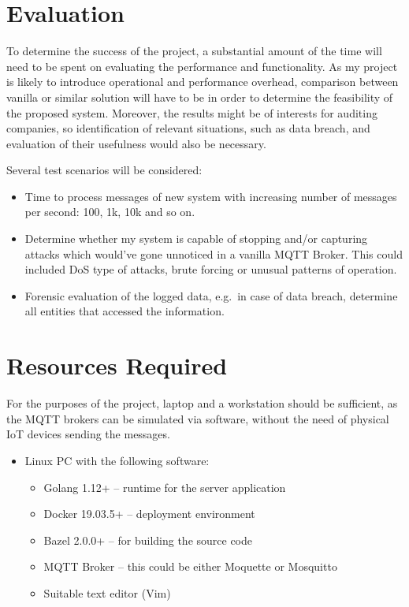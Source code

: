 \documentclass[a4paper,12pt]{article}
\begin{document}
\section*{Evaluation}
To determine the success of the project, a substantial amount of the time will need to be spent on evaluating the performance and functionality. As my project is likely to introduce operational and performance overhead, comparison between vanilla or similar solution will have to be in order to determine the feasibility of the proposed system. Moreover, the results might be of interests for auditing companies, so identification of relevant situations, such as data breach, and evaluation of their usefulness would also be necessary.

Several test scenarios will be considered:
\begin{itemize}
  \item Time to process messages of new system with increasing number of messages per second: 100, 1k, 10k and so on.
  \item Determine whether my system is capable of stopping and/or capturing attacks which would've gone unnoticed in a vanilla MQTT Broker. This could included DoS type of attacks, brute forcing or unusual patterns of operation.
  \item Forensic evaluation of the logged data, e.g.\ in case of data breach, determine all entities that accessed the information. 
\end{itemize}

\section*{Resources Required}

For the purposes of the project, laptop and a workstation should be sufficient, as the MQTT brokers can be simulated via software, without the need of physical IoT devices sending the messages.

\begin{itemize}
  \item Linux PC with the following software: 
    \begin{itemize}
      \item Golang 1.12+ -- runtime for the server application
      \item Docker 19.03.5+ -- deployment environment
      \item Bazel 2.0.0+ -- for building the source code
      \item MQTT Broker -- this could be either Moquette or Mosquitto
      \item Suitable text editor (Vim)
    \end{itemize}
\end{itemize}
\end{document}
